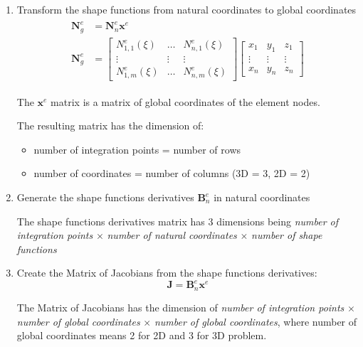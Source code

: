 \documentclass[10pt,b5paper,titlepage]{book}
\newcommand{\m}{\mathbf}
\newenvironment{eqarray}
{
    \begin{eqnarray}
        \begin{aligned}
}
{
        \end{aligned}
    \end{eqnarray}
}
\begin{document}
\begin{enumerate}
    \item Transform the shape functions from natural coordinates to global coordinates
        \begin{eqarray}
            \m{N}_g^e &= \m{N}_n^e \m{x}^e\\
            \m{N}_g^e &= \begin{bmatrix}
                N_{1,1}^e(\xi) & \dots & N_{n,1}^e(\xi)\\
                \vdots & \vdots & \vdots\\
                N_{1,m}^e(\xi) & \dots & N_{n,m}^e(\xi)
            \end{bmatrix}
            \begin{bmatrix}
                x_1 & y_1 & z_1\\
                \vdots & \vdots & \vdots\\
                x_n & y_n & z_n
            \end{bmatrix}
        \end{eqarray}

        The $ \m{x}^e $ matrix is a matrix of global coordinates of the element nodes.

        The resulting matrix has the dimension of:
        \begin{itemize}
            \item number of integration points = number of rows
            \item number of coordinates = number of columns (3D = 3, 2D = 2)
        \end{itemize}

    \item Generate the shape functions derivatives $ \m{B}_n^e $
        in natural coordinates

        The shape functions derivatives matrix has 3 dimensions being
        \textit{number of integration points} $\times$ \textit{number of natural coordinates}
        $\times$ \textit{number of shape functions}

    \item Create the Matrix of Jacobians from the shape functions derivatives:
        \begin{equation}
            \m{J} = \m{B}_n^e \m{x}^e
        \end{equation}

        The Matrix of Jacobians has the dimension of \textit{number of integration points}
        $\times$ \textit{number of global coordinates}
        $\times$ \textit{number of global coordinates}, where number of global coordinates
        means 2 for 2D and 3 for 3D problem.


\end{enumerate}
\end{document}
